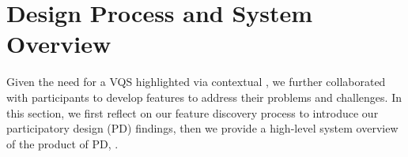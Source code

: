  \section{Design Process and System Overview\label{sec:pd_findings}}
 Given the need for a VQS highlighted via contextual , we further collaborated with participants to develop features to address their problems and challenges. In this section, we first reflect on our feature discovery process to introduce our participatory design (PD) findings, then we provide a high-level system overview of the product of PD, \zvpp.
